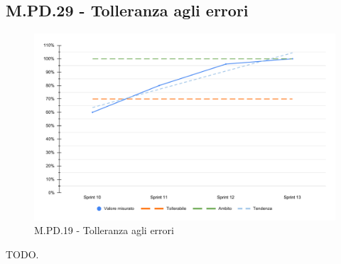 \subsection{M.PD.29 - Tolleranza agli errori}

\begin{figure}[H]
  \centering
  \includegraphics[width=\textwidth]{assets/tolleranza_errori.pdf}
  \caption{M.PD.19 - Tolleranza agli errori}
\end{figure}

\par TODO.
